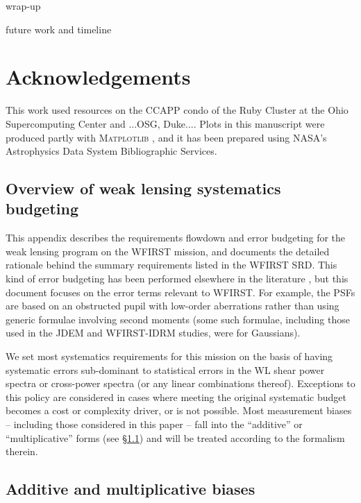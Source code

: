 \documentclass[aps,prd, amsmath,amssymb,superscriptaddress,showkeys,nofootinbib,reprint,preprintnumbers]{revtex4-1}
\begin{document}
wrap-up

future work and timeline

\section*{Acknowledgements}

This work used resources on the CCAPP condo of the Ruby Cluster at the Ohio Supercomputing Center \cite{OhioSupercomputerCenter1987} and ...OSG, Duke.... Plots in this manuscript were produced partly with \textsc{Matplotlib} \cite{Hunter:2007}, and it has been prepared using NASA's Astrophysics Data System Bibliographic Services.

\appendix

\begin{widetext}

\section{Overview of weak lensing systematics budgeting}
\label{app:wl-budget}

This appendix describes the requirements flowdown and error budgeting
for the weak lensing program on the WFIRST mission, and documents the
detailed rationale behind the summary requirements listed in the
WFIRST SRD. This kind of error budgeting has been performed elsewhere
in the literature \cite{2008A&A...484...67P,2013MNRAS.429..661M}, but
this document focuses on the error terms relevant to WFIRST. For
example, the PSFs are based on an obstructed pupil with low-order
aberrations rather than using generic formulae involving second
moments (some such formulae, including those used in the JDEM and
WFIRST-IDRM studies, were for Gaussians).

We set most systematics requirements for this mission on the basis of
having systematic errors sub-dominant to statistical errors in the WL
shear power spectra or cross-power spectra (or any linear combinations
thereof). Exceptions to this policy are considered in cases
where meeting the original systematic budget becomes a cost or
complexity driver, or is not possible. Most measurement biases -- including those considered in this paper -- fall
into the ``additive'' or ``multiplicative'' forms (see
\S\ref{ss:add_mult}) and will be treated according to the formalism
therein.

\subsection{Additive and multiplicative biases}
\label{ss:add_mult}


\end{widetext}
\end{document}
